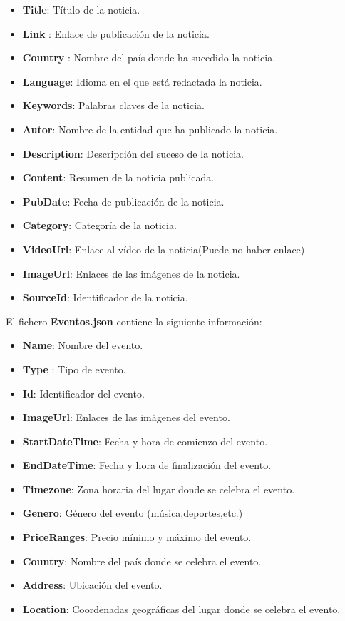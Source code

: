 \begin{itemize}
    \tightlist
    \item \textbf{Title}: Título de la noticia.
    \item \textbf{Link }: Enlace de publicación de la noticia.
    \item \textbf{Country }: Nombre del país donde ha sucedido la noticia.
    \item \textbf{Language}: Idioma en el que está redactada la noticia.
    \item \textbf{Keywords}: Palabras claves de la noticia.
    \item \textbf{Autor}:  Nombre de la entidad que ha publicado la noticia.
    \item \textbf{Description}: Descripción del suceso de la noticia.
    \item \textbf{Content}: Resumen de la noticia publicada.
    \item \textbf{PubDate}: Fecha de publicación de la noticia.
    \item \textbf{Category}: Categoría de la noticia.
    \item \textbf{VideoUrl}: Enlace al vídeo de la noticia(Puede no haber enlace)
    \item \textbf{ImageUrl}: Enlaces de las imágenes de la noticia.
    \item \textbf{SourceId}: Identificador de la noticia.	
\end{itemize}

El fichero \textbf{Eventos.json} contiene la siguiente información:
\begin{itemize}
    \tightlist
    \item \textbf{Name}: Nombre del evento.
    \item \textbf{Type }: Tipo de evento.
    \item \textbf{Id}: Identificador del evento.
    \item \textbf{ImageUrl}: Enlaces de las imágenes del evento.
    \item \textbf{StartDateTime}: Fecha y hora de comienzo del evento.
    \item \textbf{EndDateTime}: Fecha y hora de finalización del evento.
    \item \textbf{Timezone}: Zona horaria del lugar donde se celebra el evento. 
    \item \textbf{Genero}: Género del evento (música,deportes,etc.)
    \item \textbf{PriceRanges}: Precio mínimo y máximo del evento.
    \item \textbf{Country}: Nombre del país donde se celebra el evento.
    \item \textbf{Address}: Ubicación del evento.
    \item \textbf{Location}: Coordenadas geográficas del lugar donde se celebra el evento.
\end{itemize}


